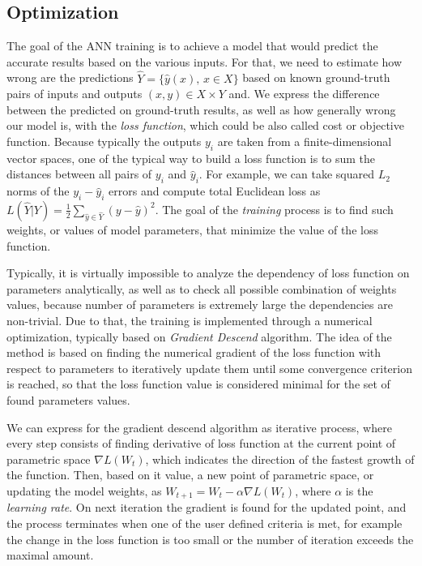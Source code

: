 \medskip


\subsection{Optimization}

The goal of the ANN training is to achieve a model that would predict the accurate results based on the various inputs.
For that, we need to estimate how wrong are the predictions $\hat{Y} = \{\hat{y}(x), \, x \in X \}$ based on known ground-truth pairs of inputs and outputs $ (x, y) \in X \times Y $ and.
We express the difference between the predicted on ground-truth results, as well as how generally wrong our model is, with the \emph{loss function}, which could be also called cost or objective function.
Because typically the outputs $y_{i}$ are taken from a finite-dimensional vector spaces, one of the typical way to build a loss function is to sum the distances between all pairs of $y_{i}$ and $\hat{y}_{i}$.
For example, we can take squared $L_{2}$ norms of the $y_{i}-\hat{y}_{i}$ errors and compute total Euclidean loss as $ L(\hat{Y}|Y) = \frac{1}{2}\sum_{\hat{y} \in \hat{Y}}(y - \hat{y})^{2} $.
The goal of the \emph{training} process is to find such weights, or values of model parameters, that minimize the value of the loss function.
\medskip

Typically, it is virtually impossible to analyze the dependency of loss function on parameters analytically, as well as to check all possible combination of weights values, because number of parameters is extremely large the dependencies are non-trivial. 
Due to that, the training is implemented through a numerical optimization, typically based on \emph{Gradient Descend} algorithm. 
The idea of the method is based on finding the numerical gradient of the loss function with respect to parameters to iteratively update them until some convergence criterion is reached, so that the loss function value is considered minimal for the set of found parameters values.
\medskip

We can express for the gradient descend algorithm as iterative process, where every step consists of finding derivative of loss function at the current point of parametric space $\nabla L(W_{t})$, which indicates the direction of the fastest growth of the function. 
Then, based on it value, a new point of parametric space, or updating the model weights, as $W_{t+1}=W_{t}-\alpha \nabla L(W_{t})$, where $\alpha$ is the \emph{learning rate}.
On next iteration the gradient is found for the updated point, and the process terminates when one of the user defined criteria is met, for example the change in the loss function is too small or the number of iteration exceeds the maximal amount.
\medskip

